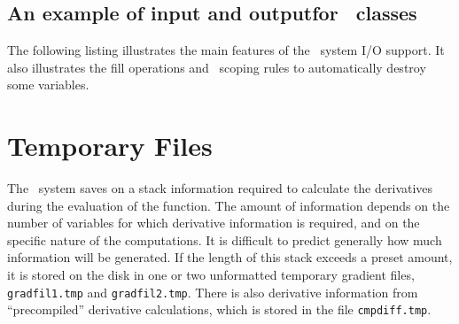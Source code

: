 \documentclass{admbmanual}
\begin{document}
\section{An example of input and output\br for \scAD\ classes}

The following listing illustrates the main features of the \scAD\ system I/O
support. It also illustrates the fill operations and \cplus\ scoping rules to
automatically destroy some variables.



\chapter{Temporary Files}

The \scAD\ system saves on a stack information required to calculate the
derivatives during the evaluation of the function. The amount of information
depends on the number of variables for which derivative information is required,
and on the specific nature of the computations. It is difficult to predict
generally how much information will be generated. If the length of this stack
exceeds a preset amount, it is stored on the disk in one or two unformatted
temporary gradient files, \texttt{gradfil1.tmp} and \texttt{gradfil2.tmp}. There
is also derivative information from ``precompiled'' derivative calculations,
which is stored in the file \texttt{cmpdiff.tmp}.
\end{document}
